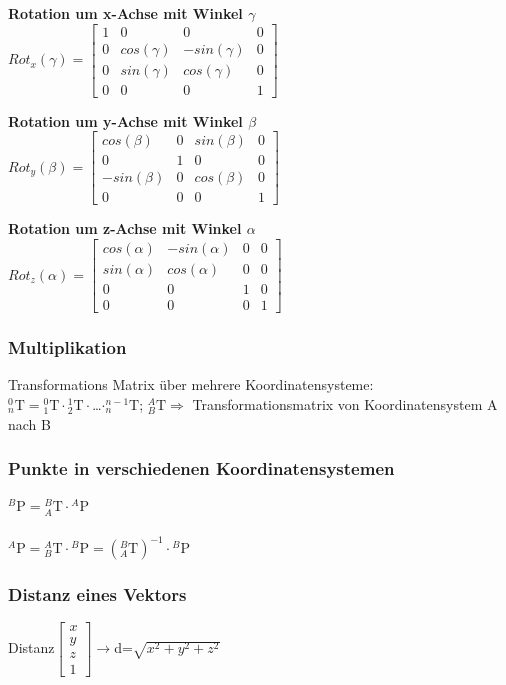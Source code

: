  
 \begin{minipage}{0.33\linewidth}
     \textbf{Rotation um x-Achse mit Winkel $ \gamma$}\newline
     $ Rot_x(\gamma)=\begin{bmatrix}
     1 & 0 & 0 & 0 \\ 
     0 & cos(\gamma) & -sin(\gamma) & 0 \\ 
     0 & sin(\gamma) & cos(\gamma) & 0 \\ 
     0 & 0 & 0 & 1
     \end{bmatrix}$
 \end{minipage}    
 \begin{minipage}{0.33\linewidth}
     \textbf{Rotation um y-Achse mit Winkel $ \beta$}\newline
     $ Rot_y(\beta)=\begin{bmatrix}
     cos(\beta)& 0  & sin(\beta)  & 0  \\ 
     0 & 1 & 0 & 0  \\ 
     -sin(\beta)&  0 & cos(\beta) & 0 \\ 
     0 & 0 & 0  & 1
     \end{bmatrix}$
 \end{minipage}
 \begin{minipage}{0.33\linewidth}
     \textbf{Rotation um z-Achse mit Winkel $\alpha$}\newline
     $Rot_z(\alpha)=\begin{bmatrix}
     cos(\alpha)& -sin(\alpha) & 0 & 0 \\ 
     sin(\alpha)&  cos(\alpha)& 0 & 0 \\ 
     0 & 0 & 1 & 0 \\ 
     0 & 0 & 0 & 1
     \end{bmatrix} $
 \end{minipage} 
 
 \subsubsection{Multiplikation }
 Transformations Matrix über mehrere Koordinatensysteme:\\
 
 ${}^0_n\mathrm{T}={}^0_1\mathrm{T}\cdot{}^1_2\mathrm{T}\cdot{}$\ldots$\cdot{}^{n-1}_n\mathrm{T}$;
 \space\space\space\space ${}^A_B\mathrm{T} \Rightarrow$
 Transformationsmatrix von Koordinatensystem A nach B
 
 \subsubsection{Punkte in verschiedenen Koordinatensystemen }
 ${}^B\mathrm{P}={}^B_A\mathrm{T}\cdot{}^A\mathrm{P}$ \\ \\
 ${}^A\mathrm{P}={}^A_B\mathrm{T}\cdot{}^B\mathrm{P}=({}^B_A\mathrm{T})^{-1}\cdot{}^B\mathrm{P}$
 
 \subsubsection{Distanz eines Vektors}
 Distanz$\begin{bmatrix}
 x\\
 y\\
 z\\
 1
 \end{bmatrix}\rightarrow$d=$\sqrt{x^2+y^2+z^2}$